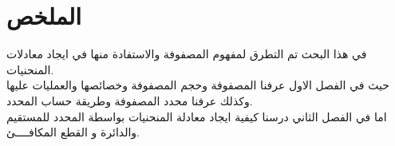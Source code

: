 \chapter*{الملخص}

في هذا البحث تم التطرق لمفهوم المصفوفة والاستفادة منها في ايجاد معادلات المنحنيات.\\
حيث في الفصل  الاول عرفنا المصفوفة وحجم المصفوفة وخصائصها والعمليات عليها وكذلك عرفنا محدد المصفوفة وطريقة حساب المحدد.\\
اما في الفصل الثاني درسنا كيفية ايجاد معادلة المنحنيات بواسطة المحدد  للمستقيم والدائرة و القطع المكافــــئ.